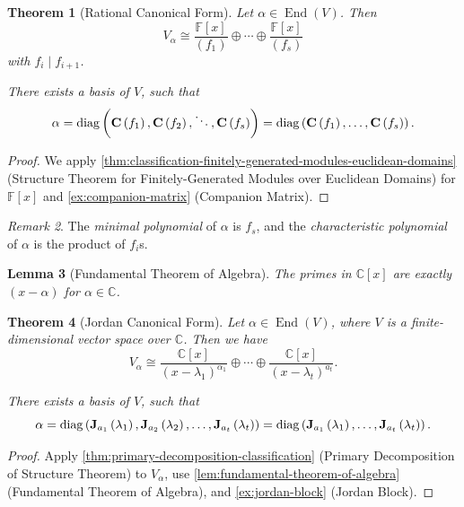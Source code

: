 \documentclass{article}
\newtheorem{theorem}{Theorem}[section]
\newtheorem{lemma}[theorem]{Lemma}
\theoremstyle{definition}
\theoremstyle{remark}
\newtheorem{remark}[theorem]{Remark}
\newcommand{\pqty}[1]{\left(#1\right)}
\newcommand{\bqty}[1]{\left[#1\right]}
\newcommand{\flatfrac}[2]{\frac{#1}{#2}}
\newcommand{\isomorphic}{\cong}
\newcommand{\divides}{\mid}
\newcommand{\CC}{\mathbb{C}}
\newcommand{\FF}{\mathbb{F}}
\newcommand{\End}{\operatorname{End}}
\newcommand{\diag}{\operatorname{diag}}
\begin{document}
\begin{theorem}[Rational Canonical Form]
    \label{thm:rational-canonical-form}%
    Let \(\alpha \in \End\pqty{V}\). Then
    \[
        V_{\alpha} \isomorphic \flatfrac{\FF\bqty{x}}{\pqty{f_1}} \oplus \cdots \oplus \flatfrac{\FF\bqty{x}}{\pqty{f_s}}
    \]
    with \(f_i \divides f_{i + 1}\).

    There exists a basis of \(V\), such that
    \[
        \alpha = \operatorname{diag}\pqty{\vb{C} \pqty{f_1}, \vb{C} \pqty{f_2}, \ddots, \vb{C} \pqty{f_s}} = \diag\pqty{\vb{C} \pqty{f_1}, \ldots, \vb{C} \pqty{f_s}}.
    \]
\end{theorem}

\begin{proof}
    We apply \autoref{thm:classification-finitely-generated-modules-euclidean-domains} (Structure Theorem for Finitely-Generated Modules over Euclidean Domains) for \(\FF\bqty{x}\) and \autoref{ex:companion-matrix} (Companion Matrix).
\end{proof}

\begin{remark}
    The \emph{minimal polynomial} of \(\alpha\) is \(f_s\), and the \emph{characteristic polynomial} of \(\alpha\) is the product of \(f_i\)s.
\end{remark}

\begin{lemma}[Fundamental Theorem of Algebra]
    \label{lem:fundamental-theorem-of-algebra}%
    The primes in \(\CC\bqty{x}\) are exactly \(\pqty{x - \alpha}\) for \(\alpha \in \CC\).
\end{lemma}

\begin{theorem}[Jordan Canonical Form]
    \label{thm:jordan-canonical-form}%
    Let \(\alpha \in \End\pqty{V}\), where \(V\) is a finite-dimensional vector space over \(\CC\). Then we have
    \[
        V_{\alpha} \isomorphic \flatfrac{\CC\bqty{x}}{\pqty{x - \lambda_1}^{\alpha_1}} \oplus \cdots \oplus \flatfrac{\CC\bqty{x}}{\pqty{x - \lambda_t}^{a_t}}.
    \]

    There exists a basis of \(V\), such that
    \[
        \alpha = \operatorname{diag}\pqty{\vb{J}_{a_1} \pqty{\lambda_1}, \vb{J}_{a_2} \pqty{\lambda_2}, \ldots, \vb{J}_{a_t} \pqty{\lambda_t}}
        = \diag\pqty{\vb{J}_{a_1} \pqty{\lambda_1}, \ldots, \vb{J}_{a_t} \pqty{\lambda_t}}.
    \]
\end{theorem}

\begin{proof}
    Apply \autoref{thm:primary-decomposition-classification} (Primary Decomposition of Structure Theorem) to \(V_{\alpha}\), use \autoref{lem:fundamental-theorem-of-algebra} (Fundamental Theorem of Algebra), and \autoref{ex:jordan-block} (Jordan Block).
\end{proof}
\end{document}
